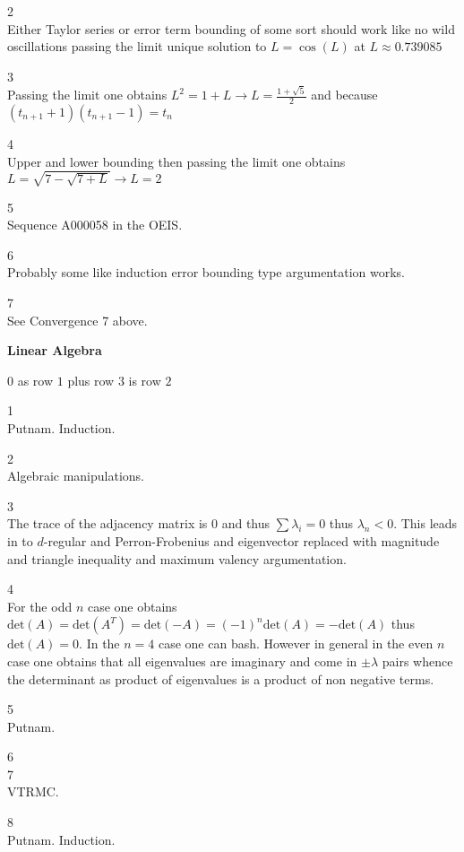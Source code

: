 2 \\
Either Taylor series or error term bounding of some sort should work like no wild oscillations passing the limit unique solution to $L=\cos(L)$ at $L \approx 0.739085$

3 \\
Passing the limit one obtains $L^2=1+L \to L=\boxed{\frac{1+\sqrt{5}}{2}}$ and because $(t_{n+1}+1)(t_{n+1}-1)=t_n$

4 \\
Upper and lower bounding then passing the limit one obtains $L=\sqrt{7-\sqrt{7+L}} \to L=\boxed{2}$

5 \\
Sequence A000058 in the OEIS.

6 \\
Probably some like induction error bounding type argumentation works.

7 \\
See Convergence 7 above.

\newpage

\textbf{Linear Algebra}

$\boxed{0}$ as row $1$ plus row $3$ is row $2$

1 \\
Putnam. Induction.

2 \\
Algebraic manipulations.

3 \\
The trace of the adjacency matrix is $0$ and thus $\sum \lambda_i =0$ thus $\lambda_n<0$. This leads in to $d$-regular and Perron-Frobenius and eigenvector replaced with magnitude and triangle inequality and maximum valency argumentation.

4 \\
For the odd $n$ case one obtains $\text{det}(A)=\text{det}(A^T)=\text{det}(-A)=(-1)^n\text{det}(A)=-\text{det}(A)$ thus $\text{det}(A)=0$. In the $n=4$ case one can bash. However in general in the even $n$ case one obtains that all eigenvalues are imaginary and come in $\pm \lambda$ pairs whence the determinant as product of eigenvalues is a product of non negative terms.

5 \\
Putnam.

6 \\


7 \\
VTRMC.

8 \\
Putnam. Induction.

